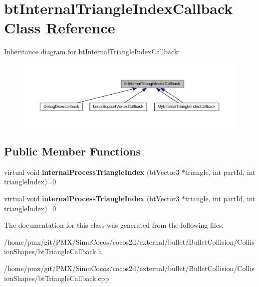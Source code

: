\hypertarget{classbtInternalTriangleIndexCallback}{}\section{bt\+Internal\+Triangle\+Index\+Callback Class Reference}
\label{classbtInternalTriangleIndexCallback}


Inheritance diagram for bt\+Internal\+Triangle\+Index\+Callback\+:
\nopagebreak
\begin{figure}[H]
\begin{center}
\leavevmode
\includegraphics[width=350pt]{classbtInternalTriangleIndexCallback__inherit__graph}
\end{center}
\end{figure}
\subsection*{Public Member Functions}
\begin{DoxyCompactItemize}
\item 
\mbox{\label{classbtInternalTriangleIndexCallback_a4fceb775c86c2d63b41ad9be24ee7fd5}} 
virtual void {\bfseries internal\+Process\+Triangle\+Index} (bt\+Vector3 $\ast$triangle, int part\+Id, int triangle\+Index)=0
\item 
\mbox{\label{classbtInternalTriangleIndexCallback_a4fceb775c86c2d63b41ad9be24ee7fd5}} 
virtual void {\bfseries internal\+Process\+Triangle\+Index} (bt\+Vector3 $\ast$triangle, int part\+Id, int triangle\+Index)=0
\end{DoxyCompactItemize}


The documentation for this class was generated from the following files\+:\begin{DoxyCompactItemize}
\item 
/home/pmx/git/\+P\+M\+X/\+Simu\+Cocos/cocos2d/external/bullet/\+Bullet\+Collision/\+Collision\+Shapes/bt\+Triangle\+Callback.\+h\item 
/home/pmx/git/\+P\+M\+X/\+Simu\+Cocos/cocos2d/external/bullet/\+Bullet\+Collision/\+Collision\+Shapes/bt\+Triangle\+Callback.\+cpp\end{DoxyCompactItemize}
